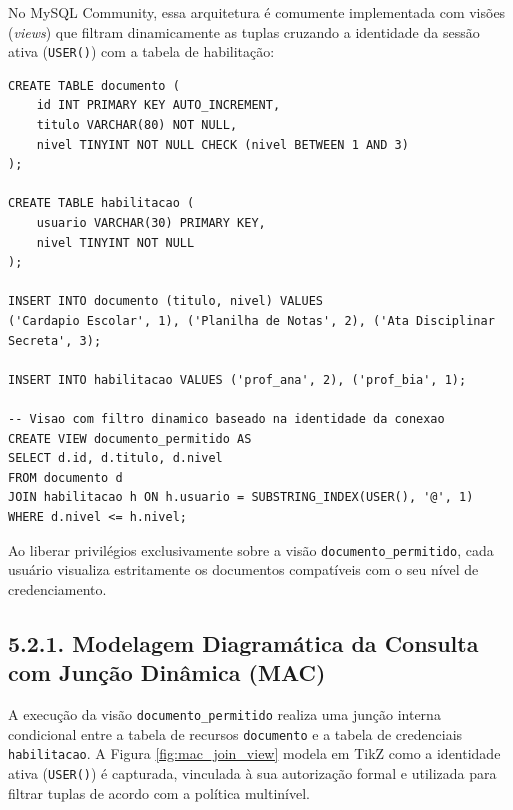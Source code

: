 No MySQL Community, essa arquitetura é comumente implementada com visões (\textit{views}) que filtram dinamicamente as tuplas cruzando a identidade da sessão ativa (\texttt{USER()}) com a tabela de habilitação:

\begin{lstlisting}
CREATE TABLE documento (
    id INT PRIMARY KEY AUTO_INCREMENT,
    titulo VARCHAR(80) NOT NULL,
    nivel TINYINT NOT NULL CHECK (nivel BETWEEN 1 AND 3)
);

CREATE TABLE habilitacao (
    usuario VARCHAR(30) PRIMARY KEY,
    nivel TINYINT NOT NULL
);

INSERT INTO documento (titulo, nivel) VALUES
('Cardapio Escolar', 1), ('Planilha de Notas', 2), ('Ata Disciplinar Secreta', 3);

INSERT INTO habilitacao VALUES ('prof_ana', 2), ('prof_bia', 1);

-- Visao com filtro dinamico baseado na identidade da conexao
CREATE VIEW documento_permitido AS
SELECT d.id, d.titulo, d.nivel
FROM documento d
JOIN habilitacao h ON h.usuario = SUBSTRING_INDEX(USER(), '@', 1)
WHERE d.nivel <= h.nivel;
\end{lstlisting}

Ao liberar privilégios exclusivamente sobre a visão \texttt{documento\_permitido}, cada usuário visualiza estritamente os documentos compatíveis com o seu nível de credenciamento.

\subsection*{5.2.1. Modelagem Diagramática da Consulta com Junção Dinâmica (MAC)}

A execução da visão \texttt{documento\_permitido} realiza uma junção interna condicional entre a tabela de recursos \texttt{documento} e a tabela de credenciais \texttt{habilitacao}. A Figura \ref{fig:mac_join_view} modela em TikZ como a identidade ativa (\texttt{USER()}) é capturada, vinculada à sua autorização formal e utilizada para filtrar tuplas de acordo com a política multinível.

